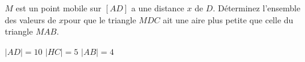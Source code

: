 %
%
    \(M\) est un point mobile sur \([AD]\) a une distance \(x\) de \(D\). Déterminez l'ensemble des valeurs de \(x\)pour que le triangle \(MDC\) ait une aire plus petite que celle du triangle \(MAB\).

    \parbox{3cm}{%
        \(\lvert AD \rvert=10\)\medbreak
        \(\lvert HC \rvert=5\)\medbreak
        \(\lvert AB \rvert=4\)%
    }
    \hfil
